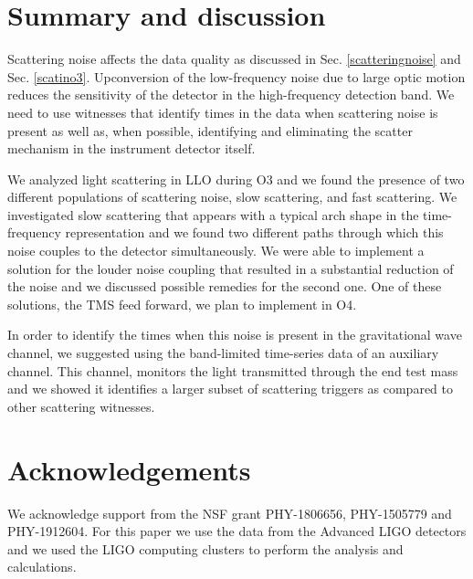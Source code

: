 \documentclass[12pt]{iopart}
\begin{document}
\newpage
\section{Summary and discussion}\label{summary}
 Scattering noise affects the data quality as discussed in Sec. \ref{scatteringnoise} and Sec. \ref{scatino3}. Upconversion of the low-frequency noise due to large optic motion reduces the sensitivity of the detector in the high-frequency detection band. We need to use witnesses that identify times in the data when scattering noise is present as well as, when possible, identifying and eliminating the scatter mechanism in the instrument detector itself. 

We analyzed light scattering in LLO during O3 and we found the presence of two different populations of scattering noise, slow scattering, and fast scattering. We investigated slow scattering that appears with a typical arch shape in the time-frequency representation and we found two different paths through which this noise couples to the detector simultaneously. We were able to implement a solution for the louder noise coupling that resulted in a substantial reduction of the noise and we discussed possible remedies for the second one. One of these solutions, the TMS feed forward, we plan to implement in O4.

In order to identify the times when this noise is present in the gravitational wave channel, we suggested using the band-limited time-series data of an auxiliary channel. This channel, monitors the light transmitted through the end test mass and we showed it identifies a larger subset of scattering triggers as compared to other scattering witnesses.
\par

\section{Acknowledgements} We acknowledge support from the NSF grant PHY-1806656, PHY-1505779 and  PHY-1912604. For this paper we use the data from the Advanced LIGO detectors and we used the LIGO computing clusters to perform the analysis and calculations. 

  

\end{document}
